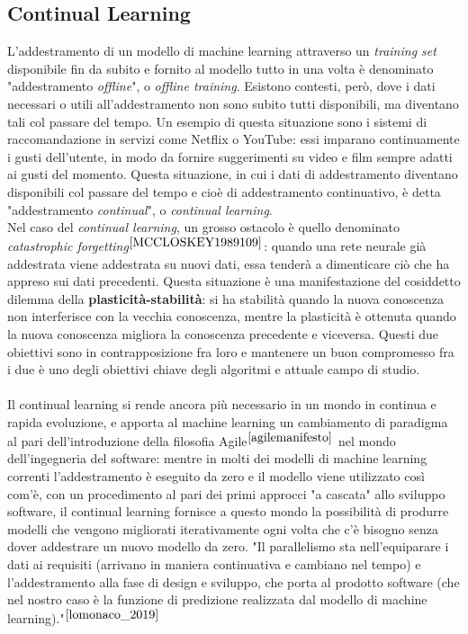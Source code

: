 \subsection*{Continual Learning} L'addestramento di un modello di machine learning attraverso un \textit{training set} disponibile fin da subito e fornito al modello tutto in una volta è denominato "addestramento \textit{offline}", o \textit{offline training}. Esistono contesti, però, dove i dati necessari o utili all'addestramento non sono subito tutti disponibili, ma diventano tali col passare del tempo. Un esempio di questa situazione sono i sistemi di raccomandazione in servizi come Netflix o YouTube: essi imparano continuamente i gusti dell'utente, in modo da fornire suggerimenti su video e film sempre adatti ai gusti del momento. Questa situazione, in cui i dati di addestramento diventano disponibili col passare del tempo e cioè di addestramento continuativo, è detta "addestramento \textit{continual}", o \textit{continual learning}.\\
Nel caso del \textit{continual learning}, un grosso ostacolo è quello denominato \textit{catastrophic forgetting}$^{\cite{MCCLOSKEY1989109}}$: quando una rete neurale già addestrata viene addestrata su nuovi dati, essa tenderà a dimenticare ciò che ha appreso sui dati precedenti. Questa situazione è una manifestazione del cosiddetto dilemma della \textbf{plasticità-stabilità}: si ha stabilità quando la nuova conoscenza non interferisce con la vecchia conoscenza, mentre la plasticità è ottenuta quando la nuova conoscenza migliora la conoscenza precedente e viceversa. Questi due obiettivi sono in contrapposizione fra loro e mantenere un buon compromesso fra i due è uno degli obiettivi chiave degli algoritmi e attuale campo di studio.\\\\
Il continual learning si rende ancora più necessario in un mondo in continua e rapida evoluzione, e apporta al machine learning un cambiamento di paradigma al pari dell'introduzione della filosofia Agile$^{\cite{agilemanifesto}}$ nel mondo dell'ingegneria del software: mentre in molti dei modelli di machine learning correnti l'addestramento è eseguito da zero e il modello viene utilizzato così com'è, con un procedimento al pari dei primi approcci "a cascata" allo sviluppo software, il continual learning fornisce a questo mondo la possibilità di produrre modelli che vengono migliorati iterativamente ogni volta che c'è bisogno senza dover addestrare un nuovo modello da zero. "Il parallelismo sta nell'equiparare i dati ai requisiti (arrivano in maniera continuativa e cambiano nel tempo) e l'addestramento alla fase di design e sviluppo, che porta al prodotto software (che nel nostro caso è la funzione di predizione realizzata dal modello di machine learning)."$^{\cite{lomonaco_2019}}$

